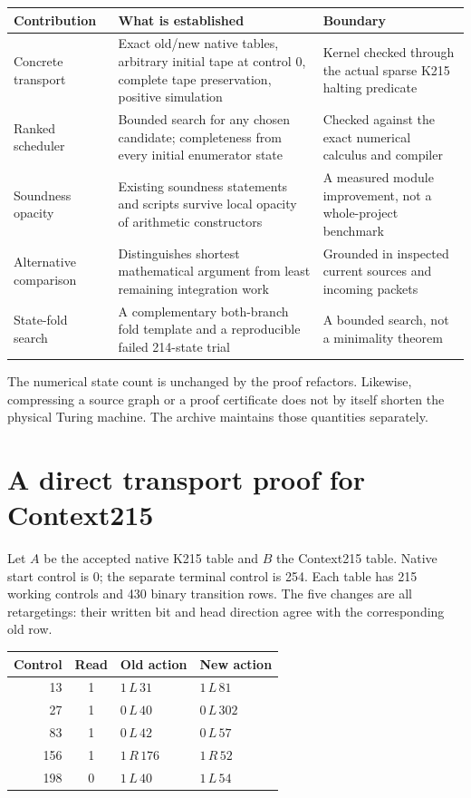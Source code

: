\documentclass[11pt]{article}
\begin{document}
\begin{longtable}{@{}>{\raggedright\arraybackslash}p{}>{\raggedright\arraybackslash}p{}>{\raggedright\arraybackslash}p{}@{}}
\toprule
Contribution & What is established & Boundary\\
\midrule\endhead
Concrete transport & Exact old/new native tables, arbitrary initial tape at control 0, complete tape preservation, positive simulation & Kernel checked through the actual sparse K215 halting predicate\\
Ranked scheduler & Bounded search for any chosen candidate; completeness from every initial enumerator state & Checked against the exact numerical calculus and compiler\\
Soundness opacity & Existing soundness statements and scripts survive local opacity of arithmetic constructors & A measured module improvement, not a whole-project benchmark\\
Alternative comparison & Distinguishes shortest mathematical argument from least remaining integration work & Grounded in inspected current sources and incoming packets\\
State-fold search & A complementary both-branch fold template and a reproducible failed 214-state trial & A bounded search, not a minimality theorem\\
\bottomrule
\end{longtable}

The numerical state count is unchanged by the proof refactors. Likewise, compressing a source graph or a proof certificate does not by itself shorten the physical Turing machine. The archive maintains those quantities separately.

\section{A direct transport proof for Context215}
\label{sec:transport}

Let $A$ be the accepted native K215 table and $B$ the Context215 table. Native start control is 0; the separate terminal control is 254. Each table has 215 working controls and 430 binary transition rows. The five changes are all retargetings: their written bit and head direction agree with the corresponding old row.

\begin{center}
\begin{tabular}{@{}rcll@{}}
\toprule
Control & Read & Old action & New action\\
\midrule
13 & 1 & $1\,L\,31$ & $1\,L\,81$\\
27 & 1 & $0\,L\,40$ & $0\,L\,302$\\
83 & 1 & $0\,L\,42$ & $0\,L\,57$\\
156 & 1 & $1\,R\,176$ & $1\,R\,52$\\
198 & 0 & $1\,L\,40$ & $1\,L\,54$\\
\bottomrule
\end{tabular}
\end{center}
\end{document}
